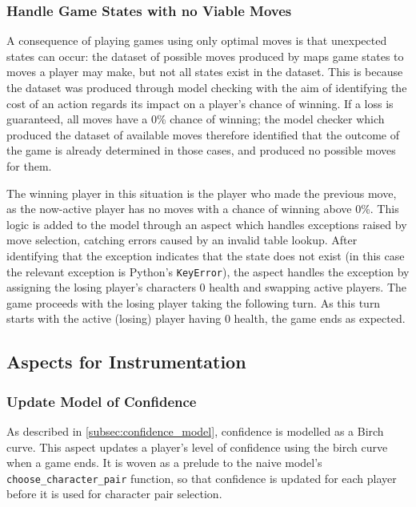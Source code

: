 \subsubsection{Handle Game States with no Viable Moves}

A consequence of playing games using only optimal moves is that unexpected
states can occur: the dataset of possible moves produced by
\citet{kavanagh2021thesis} maps game states to moves a player may make, but not
all states exist in the dataset. This is because the dataset was produced
through model checking with the aim of identifying the cost of an action regards
its impact on a player's chance of winning. If a loss is guaranteed, all moves
have a 0\% chance of winning; the model checker which produced the dataset of
available moves therefore identified that the outcome of the game is already
determined in those cases, and produced no possible moves for them. 

The winning player in this situation is the player who made the previous move,
as the now-active player has no moves with a chance of winning above 0\%. This
logic is added to the model through an aspect which handles exceptions raised by
move selection, catching errors caused by an invalid table lookup. After
identifying that the exception indicates that the state does not exist (in this
case the relevant exception is Python's \lstinline{KeyError}), the aspect
handles the exception by assigning the losing player's characters 0 health and
swapping active players. The game proceeds with the losing player taking the
following turn. As this turn starts with the active (losing) player having 0
health, the game ends as expected.


\subsection{Aspects for Instrumentation}\label{subsec:aspects_instrumenting_model}

\subsubsection{Update Model of Confidence}
\label{confidence_model_aspect_impl_writeup}

As described in \cref{subsec:confidence_model}, confidence is modelled as a
Birch curve. This aspect updates a player's level of confidence using the birch
curve when a game ends. It is woven as a prelude to the naive model's
\lstinline{choose_character_pair} function, so that confidence is updated for
each player before it is used for character pair selection.

